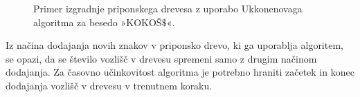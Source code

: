 \begin{figure}[htb]
\begin{subfigure}[t]{0.3\linewidth}
    \subcaption*{}
        
        \centering
        \label{fig:Ukkonen1}
    \end{subfigure}
    \hspace{0.5cm}
    \begin{subfigure}[t]{0.3\linewidth}
        \subcaption*{}
        
        \centering
        \label{fig:Ukkonen2}
    \end{subfigure}
    \hspace{0.5cm}
    \begin{subfigure}[t]{0.3\linewidth}
        \subcaption*{}
        
        \centering
        \label{fig:Ukkonen3}
    \end{subfigure}
    
    \begin{subfigure}[t]{0.3\linewidth}
        \subcaption*{}
        
        \centering
        \label{fig:Ukkonen4}
    \end{subfigure}
    \hspace{0.5cm}
    \begin{subfigure}[t]{0.3\linewidth}
        \subcaption*{}
        
        \centering
        \label{fig:Ukkonen5}
    \end{subfigure}
    \hspace{0.5cm}
    \begin{subfigure}[t]{0.3\textwidth}
        \subcaption*{}
        
        \centering
        \label{fig:Ukkonen6}
    \end{subfigure}

       \caption{Primer izgradnje priponskega drevesa z uporabo Ukkonenovaga algoritma za besedo »KOKOŠ$\$$«.} 
        \label{fig:Ukkonen}
\end{figure}

Iz načina dodajanja novih znakov v priponsko drevo, ki ga uporablja algoritem, se opazi, da se število vozlišč v drevesu spremeni samo z drugim načinom dodajanja. Za časovno učinkovitost algoritma je potrebno hraniti začetek in konec dodajanja vozlišč v drevesu v trenutnem koraku.

